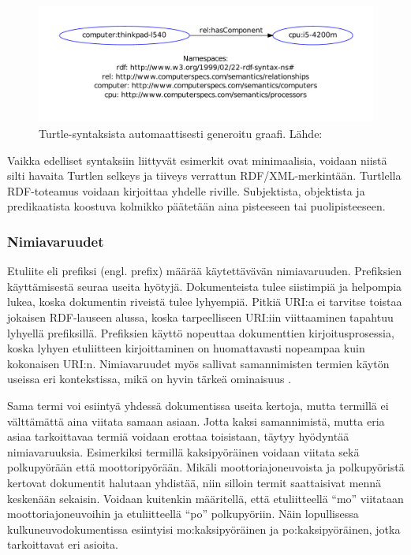 \documentclass[finnish, 12pt, a4paper, elec, utf8, pdfa, online]{aaltothesis}
\begin{document}
\begin{figure}[htb]
\centering
\includegraphics[width=15cm]{images/RDF-triplet2.pdf}
\vspace{-3pc}
\caption{Turtle-syntaksista automaattisesti generoitu graafi. Lähde: \cite{SeCo_RDF_validator} \label{images/RDF-triplet2}}
\end{figure}

Vaikka edelliset syntaksiin liittyvät esimerkit ovat minimaalisia, voidaan niistä silti havaita Turtlen selkeys ja tiiveys verrattun RDF/XML-merkintään. Turtlella RDF-toteamus voidaan kirjoittaa yhdelle riville. Subjektista, objektista ja predikaatista koostuva kolmikko päätetään aina pisteeseen tai puolipisteeseen.


\subsubsection{Nimiavaruudet}
Etuliite eli prefiksi (engl. prefix) määrää käytettävävän nimiavaruuden. Prefiksien käyttämisestä seuraa useita hyötyjä. Dokumenteista tulee siistimpiä ja helpompia lukea, koska dokumentin riveistä tulee lyhyempiä. Pitkiä URI:a ei tarvitse toistaa jokaisen RDF-lauseen alussa, koska tarpeelliseen URI:iin viittaaminen tapahtuu lyhyellä prefiksillä. Prefiksien käyttö nopeuttaa dokumenttien kirjoitusprosessia, koska lyhyen etuliitteen kirjoittaminen on huomattavasti nopeampaa kuin kokonaisen URI:n. Nimiavaruudet myös sallivat samannimisten termien käytön useissa eri kontekstissa, mikä on hyvin tärkeä ominaisuus \cite{Antoniou}.

Sama termi voi esiintyä yhdessä dokumentissa useita kertoja, mutta termillä ei välttämättä aina viitata samaan asiaan. Jotta kaksi samannimistä, mutta eria asiaa tarkoittavaa termiä voidaan erottaa toisistaan, täytyy hyödyntää nimiavaruuksia. Esimerkiksi termillä kaksipyöräinen voidaan viitata sekä polkupyörään että moottoripyörään. Mikäli moottoriajoneuvoista ja polkupyöristä kertovat dokumentit halutaan yhdistää, niin silloin termit saattaisivat mennä keskenään sekaisin. Voidaan kuitenkin määritellä, että etuliitteellä ``mo'' viitataan moottoriajoneuvoihin ja etuliitteellä ``po'' polkupyöriin. Näin lopullisessa kulkuneuvodokumentissa esiintyisi mo:kaksipyöräinen ja po:kaksipyöräinen, jotka tarkoittavat eri asioita.
\end{document}
